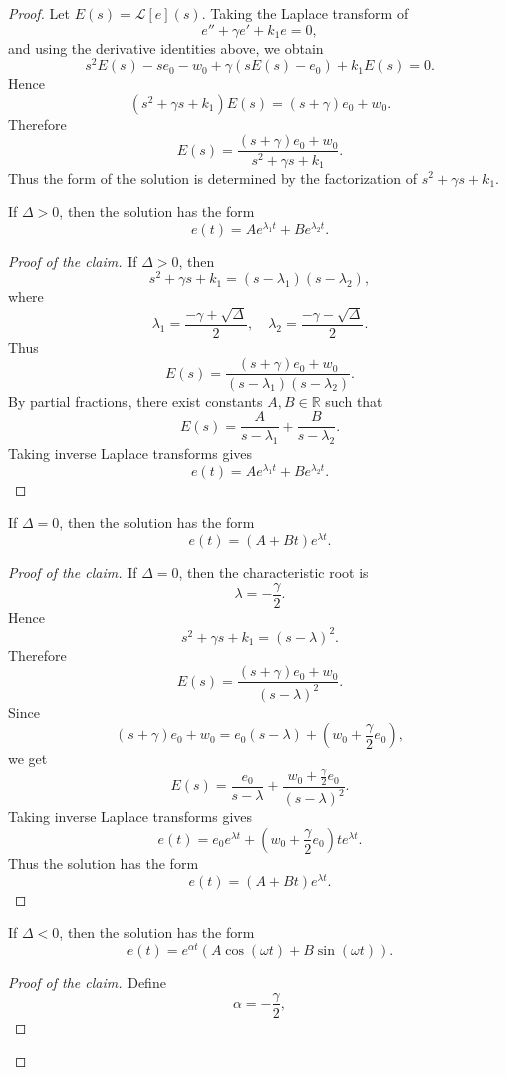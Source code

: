 ﻿\documentclass[12pt]{article}
\begin{document}
\begin{proof}
Let $E(s) = \mathcal L[e](s)$. Taking the Laplace transform of
\[
 e'' + \gamma e' + k_1e = 0,
\]
and using the derivative identities above, we obtain
\[
 s^2E(s) - se_0 - w_0 + \gamma(sE(s) - e_0) + k_1E(s) = 0.
\]
Hence
\[
 (s^2 + \gamma s + k_1)E(s) = (s + \gamma)e_0 + w_0.
\]
Therefore
\[
 E(s) = \frac{(s + \gamma)e_0 + w_0}{s^2 + \gamma s + k_1}.
\]
Thus the form of the solution is determined by the factorization of $s^2 + \gamma s + k_1$.
\begin{claim}
If $\Delta > 0$, then the solution has the form
\[
 e(t) = Ae^{\lambda_1t} + Be^{\lambda_2t}.
\]
\end{claim}
\begin{proof}[Proof of the claim]
If $\Delta > 0$, then
\[
 s^2 + \gamma s + k_1 = (s - \lambda_1)(s - \lambda_2),
\]
where
\[
 \lambda_1 = \frac{-\gamma + \sqrt{\Delta}}2,
 \quad
 \lambda_2 = \frac{-\gamma - \sqrt{\Delta}}2.
\]
Thus
\[
 E(s)
 =
 \frac{(s + \gamma)e_0 + w_0}{(s - \lambda_1)(s - \lambda_2)}.
\]
By partial fractions, there exist constants $A, B \in \mathbb R$ such that
\[
 E(s) = \frac{A}{s - \lambda_1} + \frac{B}{s - \lambda_2}.
\]
Taking inverse Laplace transforms gives
\[
 e(t) = Ae^{\lambda_1t} + Be^{\lambda_2t}.
\]
\end{proof}
\begin{claim}
If $\Delta = 0$, then the solution has the form
\[
 e(t) = (A + Bt)e^{\lambda t}.
\]
\end{claim}
\begin{proof}[Proof of the claim]
If $\Delta = 0$, then the characteristic root is 
\[
 \lambda = -\frac{\gamma}{2}.
\]
Hence
\[
 s^2 + \gamma s + k_1 = (s - \lambda)^2.
\]
Therefore
\[
 E(s) = \frac{(s + \gamma)e_0 + w_0}{(s - \lambda)^2}.
\]
Since
\[
 (s + \gamma)e_0 + w_0
 =
 e_0(s - \lambda)
 +
 \left(w_0 + \frac{\gamma}{2}e_0\right),
\]
we get
\[
 E(s)
 =
 \frac{e_0}{s - \lambda}
 +
 \frac{w_0 + \frac{\gamma}{2}e_0}{(s - \lambda)^2}.
\]
Taking inverse Laplace transforms gives
\[
 e(t)
 =
 e_0e^{\lambda t}
 +
 \left(w_0 + \frac{\gamma}{2}e_0\right)te^{\lambda t}.
\]
Thus the solution has the form
\[
 e(t) = (A + Bt)e^{\lambda t}.
\]
\end{proof}
\begin{claim}
If $\Delta < 0$, then the solution has the form
\[
 e(t) = e^{\alpha t}\left(A\cos(\omega t) + B\sin(\omega t)\right).
\]
\end{claim}
\begin{proof}[Proof of the claim]
Define
\[
 \alpha = -\frac{\gamma}{2},
\]
\end{proof}
\end{proof}
\end{document}
